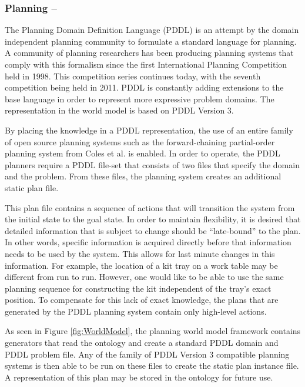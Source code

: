 \subsubsection{Planning --}
The Planning Domain Definition Language (PDDL)  is an attempt by the domain independent planning community to formulate a standard language for planning. A community of planning researchers has been producing planning systems that comply with this formalism since the first International Planning Competition held in 1998. This competition series
continues today, with the seventh competition being held in 2011. PDDL is constantly adding extensions to the base language in order to represent more expressive problem domains. The representation in the world model is based on PDDL Version 3.

By placing the knowledge in a PDDL representation, the use of an entire family of open source planning systems such as the forward-chaining partial-order planning system from Coles et al. \cite{Coles.ICAPS.2010}
is enabled. In order to operate, the PDDL planners require a PDDL file-set that consists of two files that specify the domain and the problem.
From these files, the planning system creates an additional static plan file.

This plan file contains a sequence of actions that will transition the system from the initial state to the goal state. In order to maintain flexibility, it is desired that detailed information that is subject to change should be ``late-bound'' to the plan. In other words, specific information is acquired directly before that information needs to be used by the system. This allows for last minute changes in this information. For example, the location of a kit tray on a work table may be different from run to run. However, one would like to be able to use the same planning sequence for constructing the kit independent of the tray's exact position.
To compensate for this lack of exact knowledge, the plans that are generated by the PDDL planning system contain only high-level actions.

As seen in Figure \ref{fig:WorldModel}, the planning world model framework contains generators that read the ontology and create
a standard PDDL domain and PDDL problem file. Any of the family of PDDL Version 3 compatible planning systems is then able to be
run on these files to create the static plan instance file. A representation of this plan may be stored in the ontology for future use.
%
